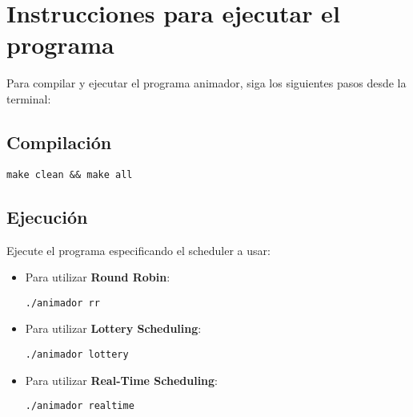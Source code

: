 \documentclass[12pt]{article}
\begin{document}
\section{Instrucciones para ejecutar el programa}

Para compilar y ejecutar el programa animador, siga los siguientes pasos desde la terminal:

\subsection*{Compilación}

\begin{verbatim}
make clean && make all
\end{verbatim}

\subsection*{Ejecución}

Ejecute el programa especificando el scheduler a usar:

\begin{itemize}
  \item Para utilizar \textbf{Round Robin}:
  \begin{verbatim}
./animador rr
  \end{verbatim}

  \item Para utilizar \textbf{Lottery Scheduling}:
  \begin{verbatim}
./animador lottery
  \end{verbatim}

  \item Para utilizar \textbf{Real-Time Scheduling}:
  \begin{verbatim}
./animador realtime
  \end{verbatim}
\end{itemize}

\newpage
\end{document}
